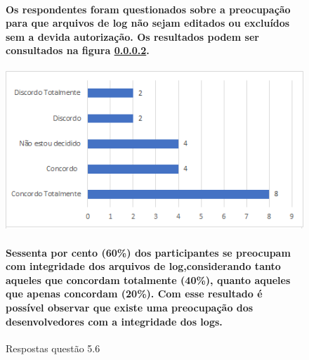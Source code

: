 \begin{figure}[!t]
\centering
\paragraph{Os respondentes foram questionados sobre a preocupação para que arquivos de log não sejam editados ou excluídos sem a devida autorização. Os resultados podem ser consultados na figura \ref{fig:5.6}.}
\includegraphics[scale=0.7]{figuras das questoes/5.6.png}
\caption{Respostas questão 5.6}
\paragraph{Sessenta por cento (60{\%}) dos participantes se preocupam com integridade dos arquivos de log,considerando tanto aqueles que concordam totalmente (40{\%}), quanto aqueles que apenas concordam (20{\%}). Com esse resultado é possível observar que existe uma preocupação dos desenvolvedores com a integridade dos logs. }
\label{fig:5.6}
\end{figure}
